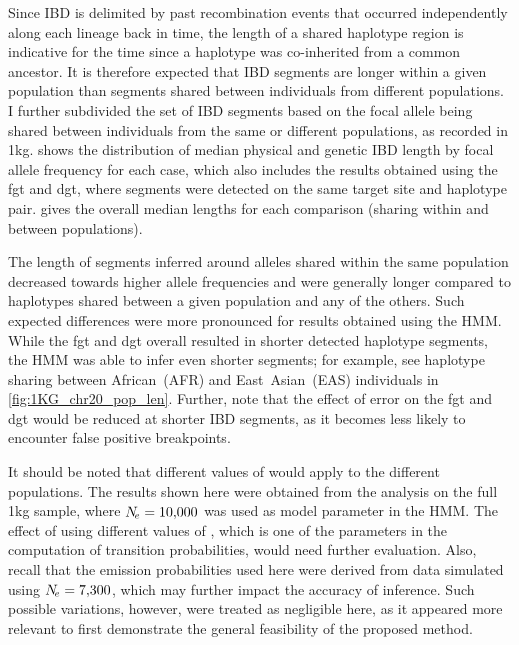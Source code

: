 %

%

Since IBD is delimited by past recombination events that occurred independently along each lineage back in time, the length of a shared haplotype region is indicative for the time since a haplotype was co-inherited from a common ancestor.
It is therefore expected that IBD segments are longer within a given population than segments shared between individuals from different populations.
I further subdivided the set of IBD segments based on the focal allele being shared between individuals from the same or different populations, as recorded in \gls{1kg}.
 shows the distribution of median physical and genetic IBD length by focal allele frequency for each case, which also includes the results obtained using the \gls{fgt} and \gls{dgt}, where segments were detected on the same target site and haplotype pair.
 gives the overall median lengths for each comparison (sharing within and between populations).

%

%

The length of segments inferred around alleles shared within the same population decreased towards higher allele frequencies and were generally longer compared to haplotypes shared between a given population and any of the others.
Such expected differences were more pronounced for results obtained using the HMM.
While the \gls{fgt} and \gls{dgt} overall resulted in shorter detected haplotype segments, the HMM was able to infer even shorter segments;
for example, see haplotype sharing between African~(AFR) and East~Asian~(EAS) individuals in \cref{fig:1KG_chr20_pop_len}.
Further, note that the effect of error on the \gls{fgt} and \gls{dgt} would be reduced at shorter IBD segments, as it becomes less likely to encounter false positive breakpoints.


It should be noted that different values of \Ne would apply to the different populations.
The results shown here were obtained from the analysis on the full \gls{1kg} sample, where $\Ne=\n{10000}$ was used as model parameter in the HMM.
The effect of using different values of \Ne, which is one of the parameters in the computation of transition probabilities, would need further evaluation.
Also, recall that the emission probabilities used here were derived from data simulated using $\Ne=\n{7300}$, which may further impact the accuracy of inference.
Such possible variations, however, were treated as negligible here, as it appeared more relevant to first demonstrate the general feasibility of the proposed method.




